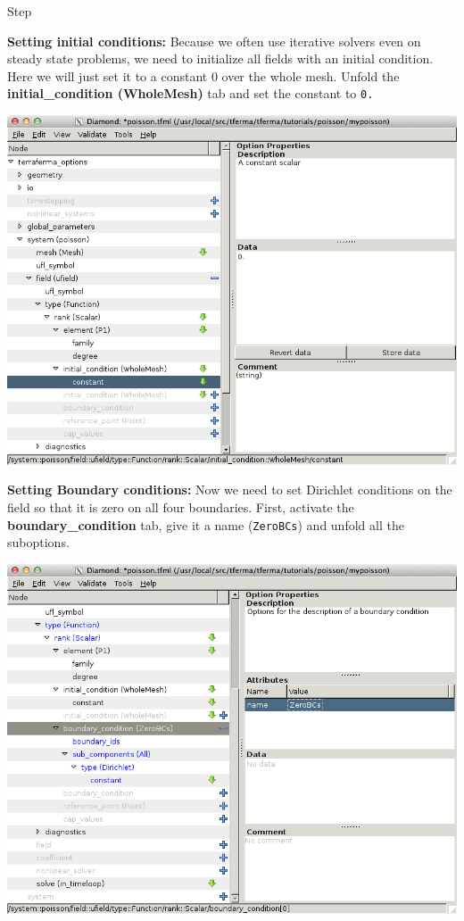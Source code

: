 \begin{steps}{Step}
\begin{center}
\end{center}
\item \textbf{Setting initial conditions:} Because we
  often use iterative solvers even on steady state problems, we need
  to initialize all fields with an initial condition.  Here we will
  just set it to a constant 0 over the whole mesh.  Unfold the
  \textbf{initial\_condition (WholeMesh)} tab and set the constant to
  \texttt{0.}
\begin{center}
    \includegraphics[width=\diamondwidth]{figures/screendumps/diamond_poisson_07c.png}
\end{center}
\item \textbf{Setting Boundary conditions:} Now we need to set
  Dirichlet conditions on the field so that it is zero on all four
  boundaries. First, activate the \textbf{boundary\_condition} tab,
  give it a name (\texttt{ZeroBCs}) and
  unfold all the suboptions. 
\begin{center}
    \includegraphics[width=\diamondwidth]{figures/screendumps/diamond_poisson_08b.png}

\end{center}
\end{steps}
